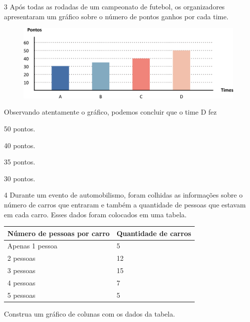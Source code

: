 \num{3} Após todas as rodadas de um campeonato de futebol, os organizadores
apresentaram um gráfico sobre o número de pontos ganhos por cada
time.

\begin{figure}[htpb!]
\centering
\includegraphics[width=\textwidth]{./media/image80.png}
\end{figure}

Observando atentamente o gráfico, podemos concluir que o time D fez

\begin{minipage}{.5\textwidth}
\begin{escolha}
\item
  50 pontos.
\item
  40 pontos.
\item
  35 pontos.
\item
  30 pontos.
\end{escolha}
\end{minipage}

\num{4} Durante um evento de automobilismo, foram colhidas as informações sobre o número de carros
que entraram e também a quantidade de pessoas que estavam em cada carro.
Esses dados foram colocados em uma tabela.

\begin{longtable}[]{@{}ll@{}}
\toprule
Número de pessoas por carro & Quantidade de carros\tabularnewline
\midrule
\endhead
Apenas 1 pessoa & 5\tabularnewline
2 pessoas & 12\tabularnewline
3 pessoas & 15\tabularnewline
4 pessoas & 7\tabularnewline
5 pessoas & 5\tabularnewline
\bottomrule
\end{longtable}

Construa um gráfico de colunas com os dados da tabela.

